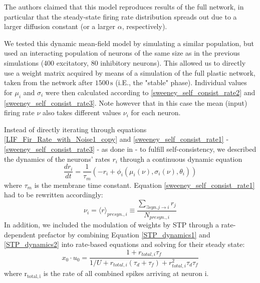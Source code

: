 \documentclass[10pt,a4paper]{article}
\begin{document}
The authors claimed that this model reproduces results of the full network, in particular that the steady-state firing rate distribution spreads out due to a larger diffusion constant (or a larger $\alpha$, respectively).

We tested this dynamic mean-field model by simulating a similar population, but used an interacting population of neurons of the same size as in the previous simulations (400 excitatory, 80 inhibitory neurons). This allowed us to directly use a weight matrix acquired by means of a simulation of the full plastic network, taken from the network after $\mathrm{1500 \, s}$ (i.E., the "stable" phase).
Individual values for $\mu_i$ and $\sigma_i$ were then calculated according to \eqref{sweeney_self_consist_rate2} and \eqref{sweeney_self_consist_rate3}. Note however that in this case the mean (input) firing rate $\nu$ also takes different values $\nu_i$ for each neuron.

Instead of directly iterating through equations \eqref{LIF_Fir_Rate_with_Noise1_copy} and \eqref{sweeney_self_consist_rate1} - \eqref{sweeney_self_consist_rate3} - as done in \cite{Sweeney_Paper} - to fulfill self-consistency, we described the dynamics of the neurons' rates $r_i$ through a continuous dynamic equation
\begin{equation}
\frac{dr_i}{dt} = \frac{1}{\tau_m} \left( -r_i + \phi_i(\mu_i(\nu),\sigma_i(\nu),\theta_i) \right)
\label{dyn_rate_equation}
\end{equation}
where $\tau_m$ is the membrane time constant. Equation \eqref{sweeney_self_consist_rate1} had to be rewritten accordingly:
\begin{equation}
\nu_i = {\langle r \rangle}_{presyn.,i} \equiv \frac{\sum_{\exists syn. j\rightarrow i} r_j}{N_{presyn., i}}
\label{sweeney_self_consist_rate1_mod}
\end{equation}
In addition, we included the modulation of weights by STP through a rate-dependent prefactor by combining Equation \eqref{STP_dynamics1} and \eqref{STP_dynamics2} into rate-based equations and solving for their steady state:
\begin{equation}
x_{0}\cdot u_{0} = \frac{1+r_{total,i} \tau_f}{1/U + r_{total,i} (\tau_d + \tau_f)+ r_{total,i}^2 \tau_d \tau_f}
\label{STP_steady}
\end{equation}
where $\mathrm{r_{total,i}}$ is the rate of all combined spikes arriving at neuron i.
\end{document}
